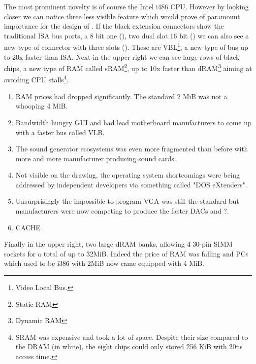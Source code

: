 \par
The most prominent novelty is of course the Intel i486 CPU. However by looking closer we can notice three less visible feature which would prove of paramount importance for the design of \doom. If the black extension connectors show the traditional ISA bus ports, a 8 bit one (), two dual slot 16 bit () we can also see a new type of connector with three slots (). These are VBL\footnote{Video Local Bus.}, a new type of bus up to 20x faster than ISA. Next in the upper right we can see large rows of black chips, a new type of RAM called sRAM\footnote{Static RAM}, up to 10x faster than dRAM\footnote{Dynamic RAM} aiming at avoiding CPU stalls\footnote{SRAM was expensive and took a lot of space. Despite their size compared to the DRAM (in white), the eight chips could only stored 256 KiB with 20ns access time.}. \\
\par
{}
\begin{enumerate}
\item RAM prices had dropped significantly. The standard 2 MiB was not a whooping 4 MiB. 
\item Bandwidth hungry GUI and had lead motherboard manufacturers to come up with a faster bus called VLB.
\item The sound generator ecosystems was even more fragmented than before with more and more manufacturer producing sound cards.
\item Not visible on the drawing, the operating system shortcomings were being addressed by independent developers via something called "DOS eXtenders".
\item Unsurprisingly the impossible to program VGA was still the standard but manufacturers were now competing to produce the faster DACs and ?.
\item CACHE
\end{enumerate}
Finally in the upper right, two large dRAM banks, allowing 4 30-pin SIMM sockets for a total of up to 32MiB. Indeed the price of RAM was falling and PCs which used to be i386 with 2MiB now came equipped with 4 MiB.\\
\par

